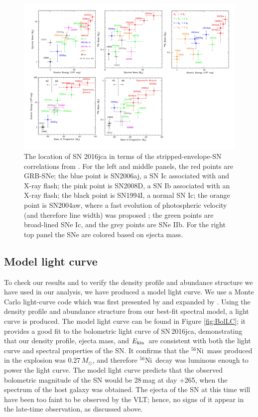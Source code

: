 \documentclass[fleqn,usenatbib]{mnras}
\newcommand{\Msun}{$M_{\odot}$}
\newcommand{\Nifs}{$^{56}$Ni}
\newcommand{\KE}{$E_{\rm kin}$}
\begin{document}

\begin{figure}
\centering
\includegraphics[width=\textwidth]{plots/corelation.pdf}
\caption{ The location of SN 2016jca in terms of the stripped-envelope-SN
correlations from \citet{Mazzali17}. For the left and
middle panels, the red points are GRB-SNe; the blue point is SN2006aj, a
SN Ic associated with and X-ray flash; the pink point is SN2008D,  a SN
Ib associated with an X-ray flash; the black point is SN1994I, a normal
SN Ic; the orange point is SN2004aw, where a fast evolution of photospheric velocity (and therefore line width) was proposed \citet{Mazzali17};  the green points are broad-lined SNe Ic, and the
grey points are SNe IIb. For the right top panel the SNe are colored
based on ejecta mass.}
\label{fig:corelations}
\end{figure}

\subsection{Model light curve}
To check our results and to verify the density profile and abundance structure we have used in our analysis, we have produced a model light curve.
We use a Monte Carlo light-curve code which was first presented by \cite{Cappellaro97} and expanded by \cite{Mazzali00}. Using the density profile and abundance structure from our best-fit  spectral model, a light curve is produced. The model light curve can be found in Figure \ref{fig:BolLC}; it provides a good fit to the bolometric light curve of SN\,2016jca, demonstrating that our density profile, ejecta mass, and \KE\ are consistent with both the light curve and spectral properties of the SN. It confirms that the \Nifs\ mass produced in the explosion was 0.27\,\Msun, and therefore \Nifs\ decay was luminous enough to power the light curve. 
The model light curve predicts that the observed bolometric magnitude of the SN would be 28\,mag at day +265, when the spectrum of the host galaxy was obtained. The ejecta of the SN at this time will have been too faint to be observed by the VLT; hence, no signs of it appear in the late-time observation, as discussed above.  
\end{document}
